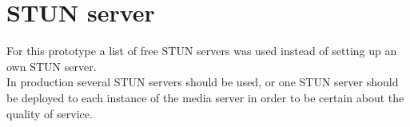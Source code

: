 \documentclass[../../../thesis.tex]{subfiles}
\begin{document}
\section{STUN server}
For this prototype a list of free STUN servers\cite{free-stun-servers} was used instead of setting up an own STUN server.\\
In production several STUN servers should be used, or one STUN server should be deployed to each instance of the media server in order to be certain about the quality of service.
\end{document}
